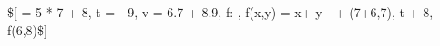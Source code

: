 \$[
\sigma = 5 * 7 + 8,
t = \sigma - 9,
v = 6.7 + 8.9,
f: \Z \rightarrow \Z,
f(x,y)  = x+  y - \sigma + \alpha(7+6,7),
t + 8,
f(6,8)\$]
